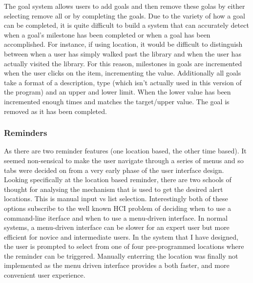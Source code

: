 \documentclass[12pt]{article} %
\begin{document}
The goal system allows users to add goals and then remove these golas by either selecting remove all or by completing the goals. Due to the variety of how a goal can be completed, it is quite difficult to build a system that can accurately detect when a goal's milestone has been completed or when a goal has been accomplished. For instance, if using location, it would be difficult to distinguish between when a user has simply walked past the library and when the user has actually visited the library. For this reason, milestones in goals are incremented when the user clicks on the item, incrementing the value. Additionally all goals take a format of a description, type (which isn't actually used in this version of the program) and an upper and lower limit. When the lower value has been incremented enough times and matches the target/upper value. The goal is removed as it has been completed.


\subsubsection{Reminders}

As there are two reminder features (one location based, the other time based). It seemed non-sensical to make the user navigate through a series of menus and so tabs were decided on from a very early phase of the user interface design. Looking specifically at the location based reminder, there are two schools of thought for analysing the mechanism that is used to get the desired alert locations. This is manual input vs list selection. Interestingly both of these options subscribe to the well known HCI problem of deciding when to use a command-line iterface and when to use a menu-driven interface. In normal systems, a menu-driven interface can be slower for an expert user but more efficient for novice and intermediate users. In the system that I have designed, the user is prompted to select from one of four pre-programmed locations where the reminder can be triggered. Manually enterring the location was finally not implemented as the menu driven interface provides a both faster, and more convenient user experience.
\end{document}
